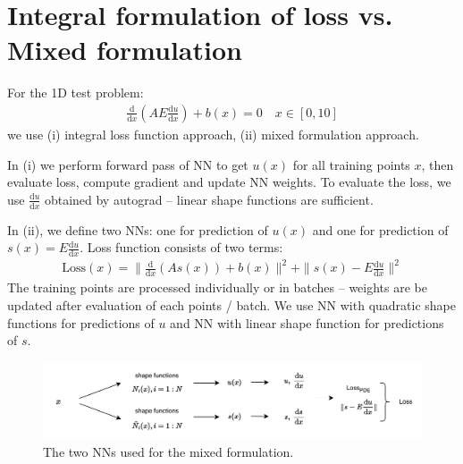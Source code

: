 \documentclass{article}
\begin{document}
\section{Integral formulation of loss vs. Mixed formulation}

For the 1D test problem:
\begin{align*}
    \frac{\mathrm{d}}{\mathrm{d}x}\left( AE \frac{\mathrm{d}u}{\mathrm{d}x}\right) + b(x) = 0 \quad x\in [0,10]
\end{align*}
we use (i) integral loss function approach, (ii) mixed formulation approach. 

In (i) we perform forward pass of NN to get $u(x)$ for all training points $x$, then evaluate loss, compute gradient and update NN weights. To evaluate the loss, we use $\frac{\mathrm{d}u}{\mathrm{d}x}$ obtained by autograd -- linear shape functions are sufficient.

In (ii), we define two NNs: one for prediction of $u(x)$ and one for prediction of $s(x) = E\frac{\mathrm{d}u}{\mathrm{d}x}$. Loss function consists of two terms:
\begin{align*}
    \mathrm{Loss}(x) = \| \frac{\mathrm{d}}{\mathrm{d}x}\left( As(x)\right) + b(x)\|^2 + \| s(x) - E\frac{\mathrm{d}u}{\mathrm{d}x}\|^2
\end{align*}
The training points are processed individually or in batches  -- weights are be updated after evaluation of each points / batch. We use NN with quadratic shape functions for predictions of $u$ and NN with linear shape function for predictions of $s$.
\begin{figure}[h!]
    \centering
    \includegraphics[width = 0.8\linewidth]{Figures/Diagram_2.pdf}
    \caption{The two NNs used for the mixed formulation.}
\end{figure}


\end{document}

